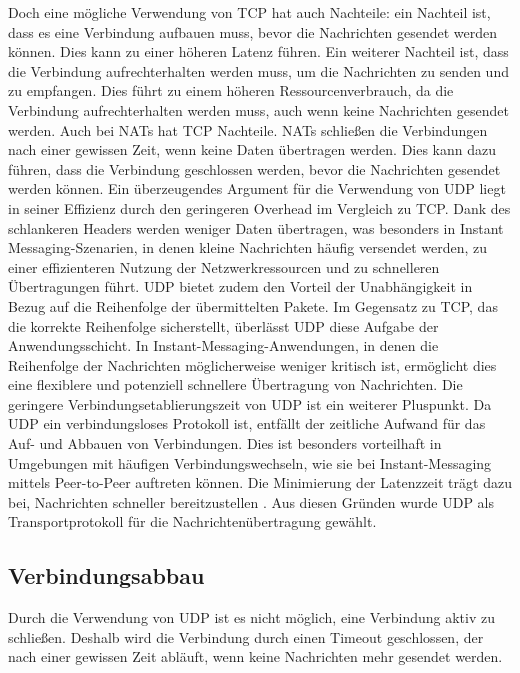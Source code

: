 Doch eine mögliche Verwendung von TCP hat auch Nachteile: ein Nachteil ist, dass es eine Verbindung aufbauen muss, bevor die Nachrichten gesendet werden können. Dies kann zu einer höheren Latenz führen. Ein weiterer Nachteil ist, dass die Verbindung aufrechterhalten werden muss, um die Nachrichten zu senden und zu empfangen. Dies führt zu einem höheren Ressourcenverbrauch, da die Verbindung aufrechterhalten werden muss, auch wenn keine Nachrichten gesendet werden. Auch bei NATs hat TCP Nachteile. NATs schließen die Verbindungen nach einer gewissen Zeit, wenn keine Daten übertragen werden. Dies kann dazu führen, dass die Verbindung geschlossen werden, bevor die Nachrichten gesendet werden können. 
Ein überzeugendes Argument für die Verwendung von UDP liegt in seiner Effizienz durch den geringeren Overhead im Vergleich zu TCP. Dank des schlankeren Headers werden weniger Daten übertragen, was besonders in Instant Messaging-Szenarien, in denen kleine Nachrichten häufig versendet werden, zu einer effizienteren Nutzung der Netzwerkressourcen und zu schnelleren Übertragungen führt. UDP bietet zudem den Vorteil der Unabhängigkeit in Bezug auf die Reihenfolge der übermittelten Pakete. Im Gegensatz zu TCP, das die korrekte Reihenfolge sicherstellt, überlässt UDP diese Aufgabe der Anwendungsschicht. In Instant-Messaging-Anwendungen, in denen die Reihenfolge der Nachrichten möglicherweise weniger kritisch ist, ermöglicht dies eine flexiblere und potenziell schnellere Übertragung von Nachrichten. Die geringere Verbindungsetablierungszeit von UDP ist ein weiterer Pluspunkt. Da UDP ein verbindungsloses Protokoll ist, entfällt der zeitliche Aufwand für das Auf- und Abbauen von Verbindungen. Dies ist besonders vorteilhaft in Umgebungen mit häufigen Verbindungswechseln, wie sie bei Instant-Messaging mittels Peer-to-Peer auftreten können. Die Minimierung der Latenzzeit trägt dazu bei, Nachrichten schneller bereitzustellen \parencites{rfc768_UDP}{rfc9293_TCP}. 
Aus diesen Gründen wurde UDP als Transportprotokoll für die Nachrichtenübertragung gewählt.


\subsection{Verbindungsabbau}

Durch die Verwendung von UDP ist es nicht möglich, eine Verbindung aktiv zu schließen. Deshalb wird die Verbindung durch einen Timeout geschlossen, der nach einer gewissen Zeit abläuft, wenn keine Nachrichten mehr gesendet werden.